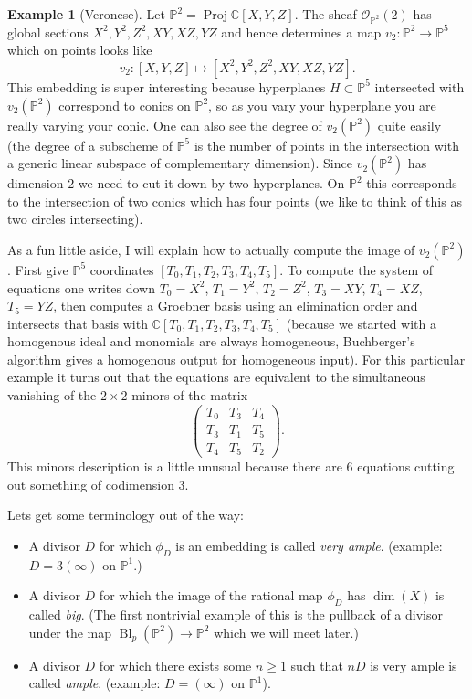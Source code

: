\documentclass[12pt]{article}
\numberwithin{equation}{section}
\theoremstyle{definition}
\newtheorem{example}[theorem]{Example}
\theoremstyle{remark}
\newcommand{\CC}{\mathbb{C}}
\newcommand{\Ocal}{\mathcal{O}}
\newcommand{\PP}{\mathbb{P}}
\newcommand{\Proj}{\operatorname{Proj}}
\newcommand{\Bl}{\operatorname{Bl}}
\begin{document}
\begin{example}[Veronese]
	Let $\PP^2 = \Proj \CC[X,Y,Z]$.
	The sheaf $\Ocal_{\PP^2}(2)$ has global sections $X^2,Y^2,Z^2,XY,XZ,YZ$ and hence determines a map $v_2: \PP^2 \to \PP^5$ which on points looks like
	 $$v_2: [X,Y,Z] \mapsto [X^2,Y^2,Z^2,XY,XZ,YZ].$$  
	This embedding is super interesting because hyperplanes $H \subset \PP^5$ intersected with $v_2(\PP^2)$ correspond to conics on $\PP^2$, so as you vary your hyperplane you are really varying your conic. 
	One can also see the degree of $v_2(\PP^2)$ quite easily (the degree of a subscheme of $\PP^5$ is the number of points in the intersection with a generic linear subspace of complementary dimension). 
	Since $v_2(\PP^2)$ has dimension $2$ we need to cut it down by two hyperplanes. 
	On $\PP^2$ this corresponds to the intersection of two conics which has four points (we like to think of this as two circles intersecting). 
	 
	 As a fun little aside, I will explain how to actually compute the image of $v_2(\PP^2)$. 
	 First give $\PP^5$ coordinates $[T_0,T_1,T_2,T_3,T_4,T_5]$. 
	 To compute the system of equations one writes down $T_0 = X^2$, $T_1=Y^2$, $T_2=Z^2$, $T_3=XY$, $T_4=XZ$, $T_5=YZ$, then computes a Groebner basis using an elimination order and intersects that basis with $\CC[T_0,T_1,T_2,T_3,T_4,T_5]$ (because we started with a homogenous ideal and monomials are always homogeneous, Buchberger's algorithm gives a homogenous output for homogeneous input).
	 For this particular example it turns out that  the equations are equivalent to the simultaneous vanishing of the $2\times 2$ minors of the matrix
	 $$\begin{pmatrix}
	 T_0 & T_3 & T_4\\
	 T_3  & T_1 & T_5 \\
	 T_4  & T_5 & T_2
	 \end{pmatrix}.$$
	 This minors description is a little unusual because there are 6 equations cutting out something of codimension 3.
\end{example}

Lets get some terminology out of the way:
	\begin{itemize}
		\item A divisor $D$ for which $\phi_D$ is an embedding is called \emph{very ample}. (example: $D=3(\infty)$ on $\PP^1$.)
		\item A divisor $D$ for which the image of the rational map $\phi_D$ has $\dim(X)$ is called \emph{big}. (The first nontrivial example of this is the pullback of a divisor under the map $\Bl_p(\PP^2) \to \PP^2$ which we will meet later.)
		\item A divisor $D$ for which there exists some $n\geq 1$ such that $nD$ is very ample is called \emph{ample}. (example: $D=(\infty)$ on $\PP^1$).
	\end{itemize}
\end{document}

